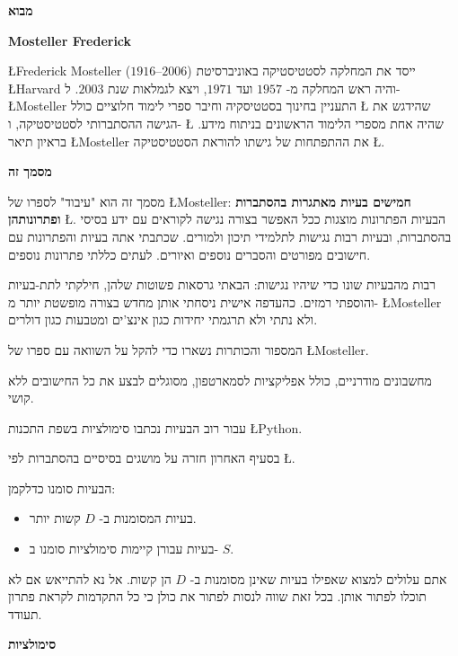 \newpage

\begin{center}
\textbf{\Large מבוא}
\end{center}


\bigskip

\textbf{Mosteller Frederick}

\L{Frederick Mosteller}
($1916$--$2006$)
ייסד את המחלקה לסטטיסטיקה באוניברסיטת 
\L{Harvard}
והיה ראש המחלקה מ-%
$1957$
ועד
$1971$,
ויצא לגמלאות שנת
$2003$.
ל-%
\L{Mosteller}
התעניין בחינוך בסטטיסקיה וחיבר ספרי לימוד חלוציים כולל 
\L{\cite{pwsa}}
שהידגש את הגישה ההסתברותי לסטטיסטיקה, ו-%
\L{\cite{bsda}}
שהיה אחת מספרי הלימוד הראשונים בניתוח מידע. בראיון תיאר 
\L{Mosteller}
את ההתפתחות של גישתו להוראת הסטטיסטיקה
\L{\cite{gse}}.

\medskip

\textbf{מסמך זה}

מסמך זה הוא "עיבוד" לספרו של 
\L{Mosteller}: 
\textbf{חמישים בעיות מאתגרות בהסתברות ופתרונותהן}
\L{\cite{fifty}}.
הבעיות הפתרונות מוצגות ככל האפשר בצורה נגישה לקוראים עם ידע בסיסי בהסתברות, ובעיות רבות נגישות לתלמידי תיכון ולמורים. שכתבתי אתה בעיות והפתרונות עם חישובים מפורטים והסברים נוספים ואיורים. לעתים כללתי פתרונות נוספים.

רבות מהבעיות שונו כדי שיהיו נגישות: הבאתי גרסאות פשוטות שלהן, חילקתי לתת-בעיות והוספתי רמזים. כהעדפה אישית ניסחתי אותן מחדש בצורה מופשטת יותר מ-%
\L{Mosteller}
ולא נתתי ולא תרגמתי יחידות כגון אינצ'ים ומטבעות כגון דולרים.

המספור והכותרות נשארו כדי להקל על השוואה עם ספרו של
\L{Mosteller}.

מחשבונים מודרניים, כולל אפליקציות לסמארטפון, מסוגלים לבצע את כל החישובים ללא קושי.

עבור רוב הבעיות נכתבו סימולציות בשפת התכנות 
\L{Python}.

בסעיף האחרון חזרה על מושגים בסיסיים בהסתברות לפי
\L{\cite{ross}}.

הבעיות סומנו כדלקמן:
\begin{itemize}
\item 
בעיות המסומנות ב-%
$D$
קשות יותר.
\item
בעיות עבורן קיימות סימולציות סומנו ב-%
$S$.
\end{itemize}
אתם עלולים למצוא שאפילו בעיות שאינן מסומנות ב-%
$D$
הן קשות. אל נא להתייאש אם לא תוכלו לפתור אותן. בכל זאת שווה לנסות לפתור את כולן כי כל התקדמות לקראת פתרון תעודד.


\textbf{סימולציות}

